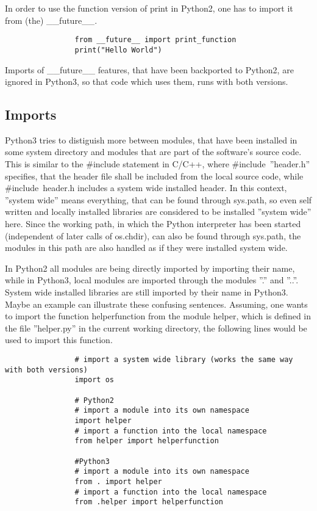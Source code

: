 			In order to use the function version of {\normalfont \ttfamily print} in Python2, one has to import it from (the) {\normalfont \ttfamily \_\_future\_\_}.
			\begin{verbatim}
				from __future__ import print_function
				print("Hello World")
			\end{verbatim}
			Imports of {\normalfont \ttfamily \_\_future\_\_} features, that have been backported to Python2, are ignored in Python3, so that code which uses them, runs with both versions.

		\subsection{Imports}
			\label{Imports}
			Python3 tries to distiguish more between modules, that have been installed in some system directory and modules that are part of the software's source code.
			This is similar to the {\normalfont \ttfamily \#include} statement in C/C++, where {\normalfont \ttfamily \#include~''header.h''} specifies, that the header file shall be included from the local source code, while {\normalfont \ttfamily \#include~\textlangle header.h\textrangle} includes a system wide installed header.
			In this context, ''system wide'' means everything, that can be found through {\normalfont \ttfamily sys.path}, so even self written and locally installed libraries are considered to be installed ''system wide'' here.
			Since the working path, in which the Python interpreter has been started (independent of later calls of {\normalfont \ttfamily os.chdir}), can also be found through {\normalfont \ttfamily sys.path}, the modules in this path are also handled as if they were installed system wide.

			In Python2 all modules are being directly imported by importing their name, while in Python3, local modules are imported through the modules ''.'' and ''..''.
			System wide installed libraries are still imported by their name in Python3.\\
			Maybe an example can illustrate these confusing sentences.
			Assuming, one wants to import the function {\normalfont \ttfamily helperfunction} from the module {\normalfont \ttfamily helper}, which is defined in the file ''helper.py'' in the current working directory, the following lines would be used to import this function.
			\begin{verbatim}
				# import a system wide library (works the same way with both versions)
				import os

				# Python2
				# import a module into its own namespace
				import helper
				# import a function into the local namespace
				from helper import helperfunction

				#Python3
				# import a module into its own namespace
				from . import helper
				# import a function into the local namespace
				from .helper import helperfunction
			\end{verbatim}


